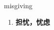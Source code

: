 
\begin{frame}
{\huge misgiving}
\begin{center}
\begin{enumerate}\Large
  \item \textbf{担忧，忧虑}
\end{enumerate}
\end{center}
\end{frame}

